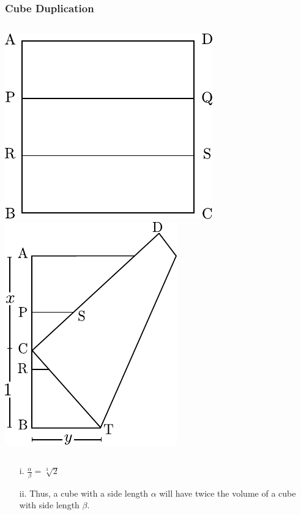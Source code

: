 \documentclass{beamer}
\begin{document}
\begin{frame}
\frametitle{Cube Duplication}
\begin{columns}
\includegraphics[width=.8\textwidth]{constructions/cube-dup1.pdf}
\includegraphics[width=.8\textwidth]{constructions/cube-dup2.pdf}
\end{columns}
\begin{enumerate}
\item[i.]
$\frac{\alpha}{\beta} = \sqrt[3]{2}$
\item[ii.]
Thus, a cube with a side length $\alpha$ will have twice the volume of a cube with side length $\beta$.
\end{enumerate}
\end{frame}
\end{document}
